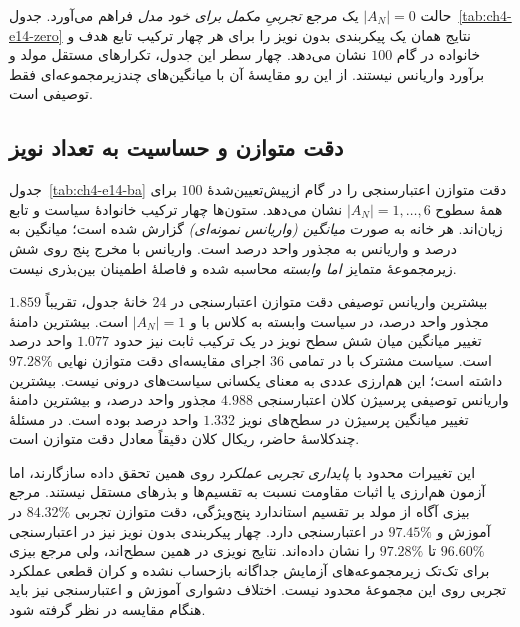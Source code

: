 حالت $|A_N|=0$ یک مرجع
\emph{تجربیِ مکمل برای خود مدل}
فراهم می‌آورد. جدول~\ref{tab:ch4-e14-zero}
نتایج همان یک پیکربندی بدون نویز
را برای هر چهار ترکیب تابع هدف و
خانواده در گام $100$ نشان می‌دهد.
چهار سطر این جدول، تکرارهای
مستقل مولد و برآورد واریانس نیستند.
از این رو مقایسهٔ آن با
میانگین‌های چندزیرمجموعه‌ای
فقط توصیفی است.



\subsection{دقت متوازن و حساسیت به تعداد نویز}
\label{subsec:ch4-e14-accuracy}

جدول~\ref{tab:ch4-e14-ba}
دقت متوازن اعتبارسنجی را
در گام ازپیش‌تعیین‌شدهٔ $100$
برای همهٔ سطوح
$|A_N|=1,\ldots,6$
نشان می‌دهد.
ستون‌ها چهار ترکیب خانوادهٔ سیاست
و تابع زیان‌اند.
هر خانه به صورت
\emph{میانگین (واریانس نمونه‌ای)}
گزارش شده است؛
میانگین به درصد و واریانس
به مجذور واحد درصد است.
واریانس با مخرج پنج
روی شش زیرمجموعهٔ متمایز
\emph{اما وابسته} محاسبه شده
و فاصلهٔ اطمینان بین‌بذری نیست.



بیشترین واریانس توصیفی
دقت متوازن اعتبارسنجی
در $24$ خانهٔ جدول،
تقریباً $1.859$ مجذور واحد درصد،
در سیاست وابسته به کلاس
با  و
$|A_N|=1$ است.
بیشترین دامنهٔ تغییر میانگین
میان شش سطح نویز
در یک ترکیب ثابت نیز
حدود $1.077$ واحد درصد است.
سیاست مشترک با
در تمامی $36$ اجرای مقایسه‌ای
دقت متوازن نهایی
$97.28\%$ داشته است؛
این هم‌ارزی عددی به معنای
یکسانی سیاست‌های درونی نیست.
بیشترین واریانس توصیفی
پرسیژن کلان اعتبارسنجی
$4.988$ مجذور واحد درصد،
و بیشترین دامنهٔ تغییر
میانگین پرسیژن در سطح‌های نویز
$1.332$ واحد درصد بوده است.
در مسئلهٔ چندکلاسهٔ حاضر،
ریکال کلان دقیقاً
معادل دقت متوازن است.

این تغییرات محدود با
\emph{پایداری تجربی عملکرد}
روی همین تحقق داده سازگارند،
اما آزمون هم‌ارزی یا
اثبات مقاومت نسبت به
تقسیم‌ها و بذرهای مستقل نیستند.
مرجع بیزی آگاه از مولد
بر تقسیم استاندارد پنج‌ویژگی،
دقت متوازن تجربی
$84.32\%$ در آموزش
و $97.45\%$ در اعتبارسنجی دارد.
چهار پیکربندی بدون نویز نیز
در اعتبارسنجی
$96.60\%$ تا $97.28\%$
را نشان داده‌اند.
نتایج نویزی در همین سطح‌اند،
ولی مرجع بیزی برای تک‌تک
زیرمجموعه‌های آزمایش
جداگانه بازحساب نشده
و کران قطعی عملکرد تجربی
روی این مجموعهٔ محدود نیست.
اختلاف دشواری آموزش و
اعتبارسنجی نیز باید
هنگام مقایسه در نظر گرفته شود.

